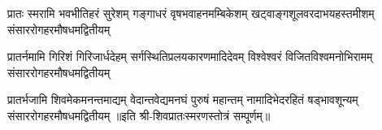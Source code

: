 
\fourlineindentedshloka
{प्रातः स्मरामि भवभीतिहरं सुरेशम्}
{गङ्गाधरं वृषभवाहनमम्बिकेशम्‌}
{खट्वाङ्गशूलवरदाभयहस्तमीशम्}
{संसाररोगहरमौषधमद्वितीयम्‌}

\fourlineindentedshloka
{प्रातर्नमामि गिरिशं गिरिजार्धदेहम्}
{सर्गस्थितिप्रलयकारणमादिदेवम्‌}
{विश्वेश्वरं विजितविश्वमनोभिरामम्}
{संसाररोगहरमौषधमद्वितीयम्‌}

\fourlineindentedshloka
{प्रातर्भजामि शिवमेकमनन्तमाद्यम्}
{वेदान्तवेद्यमनघं पुरुषं महान्तम्‌}
{नामादिभेदरहितं षड्भावशून्यम्}
{संसाररोगहरमौषधमद्वितीयम्‌}
॥इति श्री-शिवप्रातःस्मरणस्तोत्रं सम्पूर्णम्॥